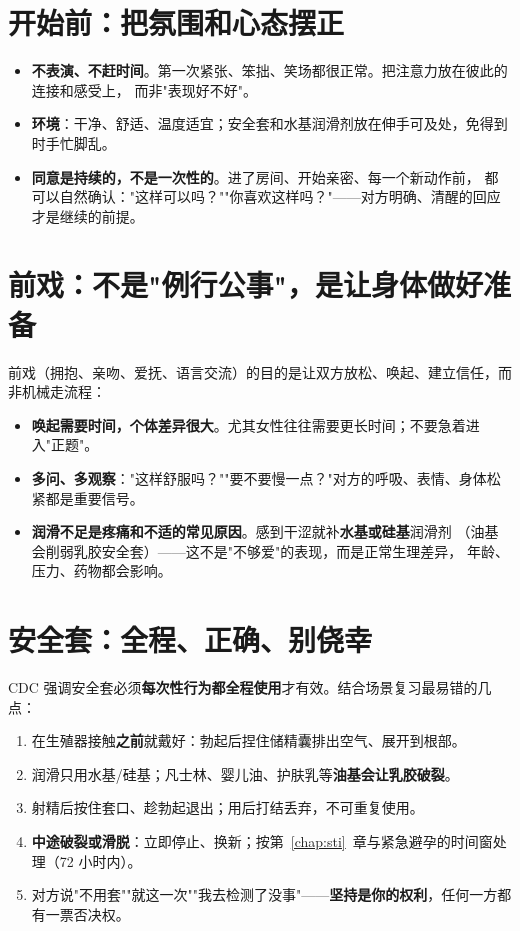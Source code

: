 \section{开始前：把氛围和心态摆正}

\begin{itemize}[leftmargin=2em]
  \item \textbf{不表演、不赶时间}。第一次紧张、笨拙、笑场都很正常。把注意力放在彼此的连接和感受上，
        而非"表现好不好"。
  \item \textbf{环境}：干净、舒适、温度适宜；安全套和水基润滑剂放在伸手可及处，免得到时手忙脚乱。
  \item \textbf{同意是持续的，不是一次性的}。进了房间、开始亲密、每一个新动作前，
        都可以自然确认："这样可以吗？""你喜欢这样吗？"——对方明确、清醒的回应才是继续的前提。
\end{itemize}

\section{前戏：不是"例行公事"，是让身体做好准备}

前戏（拥抱、亲吻、爱抚、语言交流）的目的是让双方放松、唤起、建立信任，而非机械走流程：

\begin{itemize}[leftmargin=2em]
  \item \textbf{唤起需要时间，个体差异很大}。尤其女性往往需要更长时间；不要急着进入"正题"。
  \item \textbf{多问、多观察}："这样舒服吗？""要不要慢一点？"对方的呼吸、表情、身体松紧都是重要信号。
  \item \textbf{润滑不足是疼痛和不适的常见原因}。感到干涩就补\textbf{水基或硅基}润滑剂
        （油基会削弱乳胶安全套）——这不是"不够爱"的表现，而是正常生理差异，
        年龄、压力、药物都会影响。
\end{itemize}

\section{安全套：全程、正确、别侥幸}

CDC 强调安全套必须\textbf{每次性行为都全程使用}才有效。结合场景复习最易错的几点：

\begin{enumerate}[leftmargin=2em,itemsep=0.3em]
  \item 在生殖器接触\textbf{之前}就戴好：勃起后捏住储精囊排出空气、展开到根部。
  \item 润滑只用水基/硅基；凡士林、婴儿油、护肤乳等\textbf{油基会让乳胶破裂}。
  \item 射精后按住套口、趁勃起退出；用后打结丢弃，不可重复使用。
  \item \textbf{中途破裂或滑脱}：立即停止、换新；按第~\ref{chap:sti}~章与紧急避孕的时间窗处理（72 小时内）。
  \item 对方说"不用套""就这一次""我去检测了没事"——\textbf{坚持是你的权利}，任何一方都有一票否决权。
\end{enumerate}

